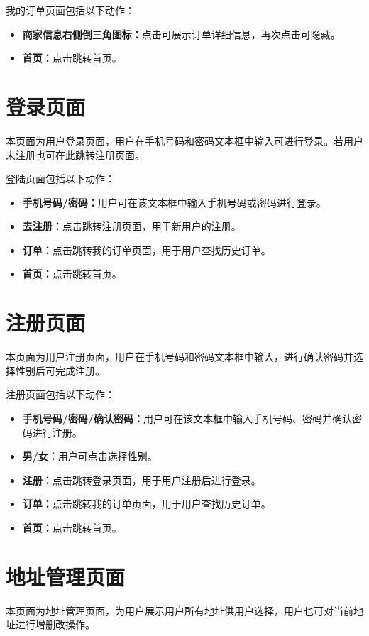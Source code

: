 \documentclass[UTF8]{ctexart}
\begin{document}
我的订单页面包括以下动作：
\begin{itemize}
    \item \textbf{商家信息右侧倒三角图标：}点击可展示订单详细信息，再次点击可隐藏。
    \item \textbf{首页：}点击跳转首页。
\end{itemize}

\section{登录页面}
本页面为用户登录页面，用户在手机号码和密码文本框中输入可进行登录。若用户未注册也可在此跳转注册页面。

登陆页面包括以下动作：
\begin{itemize}
    \item \textbf{手机号码/密码：}用户可在该文本框中输入手机号码或密码进行登录。
    \item \textbf{去注册：}点击跳转注册页面，用于新用户的注册。
    \item \textbf{订单：}点击跳转我的订单页面，用于用户查找历史订单。
    \item \textbf{首页：}点击跳转首页。
\end{itemize}

\section{注册页面}
本页面为用户注册页面，用户在手机号码和密码文本框中输入，进行确认密码并选择性别后可完成注册。

注册页面包括以下动作：
\begin{itemize}
    \item \textbf{手机号码/密码/确认密码：}用户可在该文本框中输入手机号码、密码并确认密码进行注册。
    \item \textbf{男/女：}用户可点击选择性别。
    \item \textbf{注册：}点击跳转登录页面，用于用户注册后进行登录。
    \item \textbf{订单：}点击跳转我的订单页面，用于用户查找历史订单。
    \item \textbf{首页：}点击跳转首页。
\end{itemize}

\section{地址管理页面}
本页面为地址管理页面，为用户展示用户所有地址供用户选择，用户也可对当前地址进行增删改操作。
\end{document}
